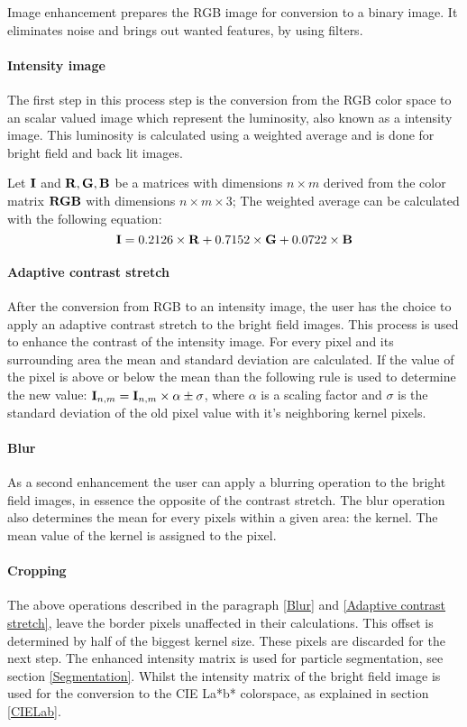 Image enhancement prepares the RGB image for conversion to a binary image. It eliminates noise and brings out wanted features, by using filters.
\paragraph{Intensity image}\label{IntensityImg} The first step in this process step is the conversion from the RGB color space to an scalar valued image which represent the luminosity, also known as a intensity image. This luminosity is calculated using a weighted average and is done for bright field and back lit images.
\begin{sBox}
	Let $\mat{I}$ and $\mat{R}, \mat{G}, \mat{B}$  be a matrices with dimensions $n \times m$ derived from the color matrix $\mat{RGB}$ with dimensions $n \times m \times 3$; The weighted average can be calculated with the following equation:
	\begin{equation}
		\mat{I} =0.2126\times \mat{R} + 0.7152\times \mat{G} + 0.0722\times \mat{B}
	\end{equation}
\end{sBox}

\paragraph{Adaptive contrast stretch}\label{Adaptive contrast stretch} After the conversion from RGB to an intensity image, the user has the choice to apply an adaptive contrast stretch to the bright field images. This process is used to enhance the contrast of the intensity image. For every pixel and its surrounding area the mean and standard deviation are calculated. If the value of the pixel is above or below the mean than the following rule is used to determine the new value: $\mat{I}_{n,m}=\mat{I}_{n,m} \times \alpha \pm \sigma$, where $\alpha$ is a scaling factor and $\sigma$ is the standard deviation of the old pixel value with it's neighboring kernel pixels.

\paragraph{Blur}\label{Blur} As a second enhancement the user can apply a blurring operation to the bright field images, in essence the opposite of the contrast stretch. The blur operation also determines the mean for every pixels within a given area: the kernel. The mean value of the kernel is assigned to the pixel.

\paragraph{Cropping}
The above operations described in the paragraph \ref{Blur} and \ref{Adaptive contrast stretch}, leave the border pixels unaffected in their calculations. This offset is determined by half of the biggest kernel size. These pixels are discarded for the next step. The enhanced intensity matrix is used for particle segmentation, see section \ref{Segmentation}. Whilst the intensity matrix of the bright field image is used for the conversion to the CIE La*b* colorspace, as explained in section \ref{CIELab}.